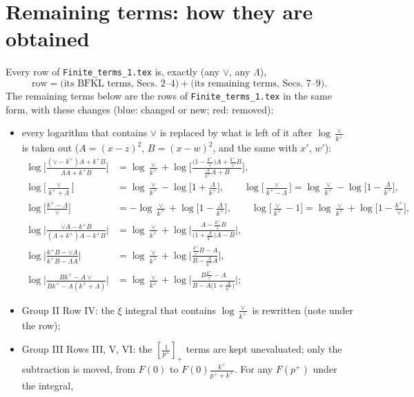\documentclass[9pt]{article}
\numberwithin{equation}{section}
\begin{document}
\section{Remaining terms: how they are obtained}
Every row of \texttt{Finite\_terms\_1.tex} is, exactly (any $\vee$, any $\Lambda$),
\begin{equation*}
\text{row}=\big(\text{its BFKL terms, Secs.~2--4}\big)+\big(\text{its remaining terms, Secs.~7--9}\big).
\end{equation*}
The remaining terms below are the rows of \texttt{Finite\_terms\_1.tex} in the same form, with these changes (blue: changed or new; red: removed):
\begin{itemize}
\item every logarithm that contains $\vee$ is replaced by what is left of it after $\log\frac{\vee}{k^+}$ is taken out ($A=(x-z)^2$, $B=(x-w)^2$, and the same with $x'$, $w'$):
\begin{align*}
\log\Big[\frac{(\vee-k^{+})A+k^{+}B}{\Lambda A+k^{+}B}\Big]&=\log\frac{\vee}{k^{+}}+\log\Big[\frac{\big(1-\frac{k^{+}}{\vee}\big)A+\frac{k^{+}}{\vee}B}{\frac{\Lambda}{k^{+}}A+B}\Big],\\
\log\Big[\frac{\vee}{k^{+}+\Lambda}\Big]&=\log\frac{\vee}{k^{+}}-\log\Big[1+\frac{\Lambda}{k^{+}}\Big],\qquad
\log\Big[\frac{\vee}{k^{+}-\Lambda}\Big]=\log\frac{\vee}{k^{+}}-\log\Big[1-\frac{\Lambda}{k^{+}}\Big],\\
\log\Big[\frac{k^{+}-\Lambda}{\vee}\Big]&=-\log\frac{\vee}{k^{+}}+\log\Big[1-\frac{\Lambda}{k^{+}}\Big],\qquad
\log\Big[\frac{\vee}{k^{+}}-1\Big]=\log\frac{\vee}{k^{+}}+\log\Big[1-\frac{k^{+}}{\vee}\Big],\\
\log\Big|\frac{\vee A-k^{+}B}{(\Lambda+k^{+})A-k^{+}B}\Big|&=\log\frac{\vee}{k^{+}}+\log\Big|\frac{A-\frac{k^{+}}{\vee}B}{\big(1+\frac{\Lambda}{k^{+}}\big)A-B}\Big|,\\
\log\Big|\frac{k^{+}B-\vee A}{k^{+}B-\Lambda A}\Big|&=\log\frac{\vee}{k^{+}}+\log\Big|\frac{\frac{k^{+}}{\vee}B-A}{B-\frac{\Lambda}{k^{+}}A}\Big|,\\
\log\Big|\frac{Bk^{+}-A\vee}{Bk^{+}-A(k^{+}+\Lambda)}\Big|&=\log\frac{\vee}{k^{+}}+\log\Big|\frac{B\frac{k^{+}}{\vee}-A}{B-A\big(1+\frac{\Lambda}{k^{+}}\big)}\Big|;
\end{align*}
\item Group II Row IV: the $\xi$ integral that contains $\log\frac{\vee}{k^+}$ is rewritten (note under the row);
\item Group III Rows III, V, VI: the $\left[\frac{1}{p^+}\right]_+$ terms are kept unevaluated; only the subtraction is moved, from $F(0)$ to $F(0)\frac{k^+}{p^++k^+}$. For any $F(p^+)$ under the integral,

\end{itemize}
\end{document}
